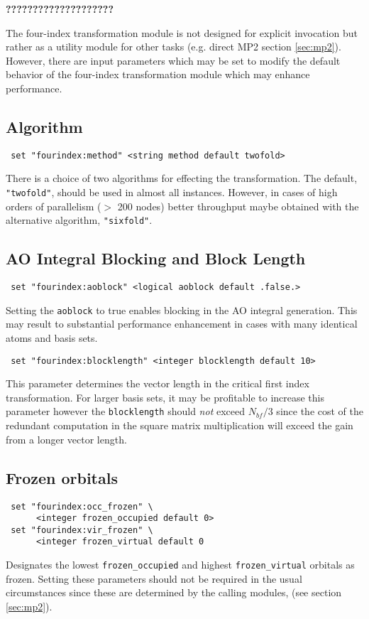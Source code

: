 \label{sec:fourindex}

{\bf ????????????????????}

The four-index transformation module is not designed for explicit
invocation but rather as a utility module for other tasks (e.g. direct
MP2 section \ref{sec:mp2}). However, there are input parameters which
may be set to modify the default behavior of the four-index
transformation module which may enhance performance.

\subsection{Algorithm}
\begin{verbatim}
 set "fourindex:method" <string method default twofold>
\end{verbatim}
There is a choice of two algorithms for effecting the transformation.
The default, \verb+"twofold"+, should be used in almost all instances.
However, in cases of high orders of parallelism ($>$ 200 nodes) better
throughput maybe obtained with the alternative algorithm, \verb+"sixfold"+.

\subsection{AO Integral Blocking and Block Length}
\begin{verbatim}
 set "fourindex:aoblock" <logical aoblock default .false.>
\end{verbatim}
Setting the \verb+aoblock+ to true enables blocking in the AO
integral generation. This may result to substantial performance
enhancement in cases with many identical atoms and basis sets.

\begin{verbatim}
 set "fourindex:blocklength" <integer blocklength default 10>
\end{verbatim}
This parameter determines the vector length in the critical first
index transformation. For larger basis sets, it may be profitable to
increase this parameter however the \verb+blocklength+ should {\em
  not} exceed $N_{bf} / 3$ since the cost of the redundant computation in the
square matrix multiplication will exceed the gain from a longer vector length.

\subsection{Frozen orbitals}
\begin{verbatim}
 set "fourindex:occ_frozen" \
      <integer frozen_occupied default 0>
 set "fourindex:vir_frozen" \
      <integer frozen_virtual default 0
\end{verbatim}
Designates the lowest \verb+frozen_occupied+ and highest
\verb+frozen_virtual+ orbitals as frozen. Setting these parameters
should not be required in the usual circumstances since these are
determined by the calling modules, (see section \ref{sec:mp2}).

